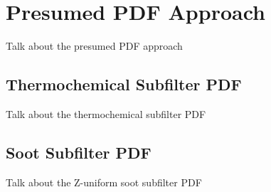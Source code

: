 \section{Presumed PDF Approach}
\label{sec:subfilter:pdf}

Talk about the presumed PDF approach


\subsection{Thermochemical Subfilter PDF}
\label{sec:subfilter:pdf:tcsp}

Talk about the thermochemical subfilter PDF


\subsection{Soot Subfilter PDF}
\label{sec:subfilter:pdf:zussp}

Talk about the Z-uniform soot subfilter PDF
